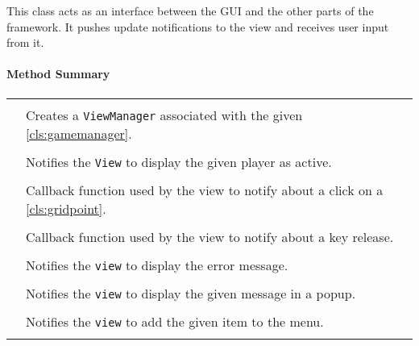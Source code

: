 \pagebreak

This class acts as an interface between the \gls{GUI} and the other parts of the \gls{framework}. It pushes update notifications to the view and receives user input from it. \\

\centerdash

\paragraph*{Method Summary}
\paragraph*{}
\begin{longtable}{Lp{10cm}}
	\startmethodtable
	 \\
	& Creates a \texttt{ViewManager} associated with the given \ref{cls:gamemanager}. \\
	 \\
	& Notifies the \texttt{View} to display the given player as active. \\
	 \\
	& Callback function used by the view to notify about a click on a \ref{cls:gridpoint}.  \\
	 \\
	& Callback function used by the view to notify about a key release. \\
	 \\
	& Notifies the \texttt{view} to display the error message. \\
	 \\
	& Notifies the \texttt{view} to display the given message in a popup. \\
	 \\
	& Notifies the \texttt{view} to add the given item to the menu. \\
	 \\

\end{longtable}

